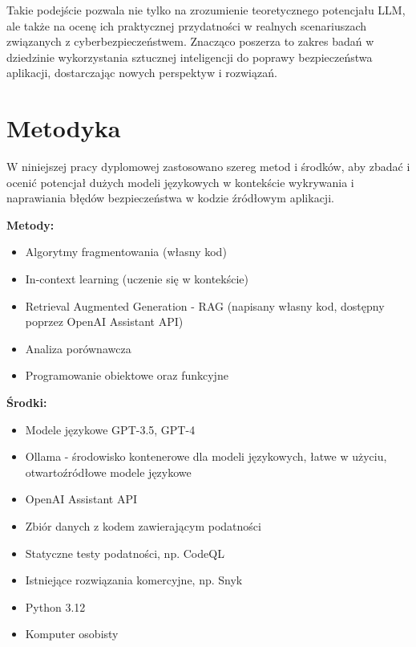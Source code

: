 Takie podejście pozwala nie tylko na zrozumienie teoretycznego potencjału LLM, ale także na ocenę ich praktycznej przydatności w realnych scenariuszach związanych z cyberbezpieczeństwem. Znacząco poszerza to zakres badań w dziedzinie wykorzystania sztucznej inteligencji do poprawy bezpieczeństwa aplikacji, dostarczając nowych perspektyw i rozwiązań.

\chapter{Metodyka}

W niniejszej pracy dyplomowej zastosowano szereg metod i środków, aby zbadać i ocenić potencjał dużych modeli językowych w kontekście wykrywania i naprawiania błędów bezpieczeństwa w kodzie źródłowym aplikacji.

\begin{multicols}{2}
\noindent
\textbf{Metody:}
\begin{itemize}
    \item Algorytmy fragmentowania (własny kod)
    \item In-context learning (uczenie się w kontekście)
    \item Retrieval Augmented Generation - RAG (napisany własny kod, dostępny poprzez OpenAI Assistant API)
    \item Analiza porównawcza
    \item Programowanie obiektowe oraz funkcyjne 
    \vfill\null
\end{itemize}

\columnbreak

\noindent
\textbf{Środki:}
\begin{itemize}
    \item Modele językowe GPT-3.5, GPT-4
    \item Ollama - środowisko kontenerowe dla modeli językowych, łatwe w użyciu, otwartoźródłowe modele językowe
    \item OpenAI Assistant API
    \item Zbiór danych z kodem zawierającym podatności
    \item Statyczne testy podatności, np. CodeQL
    \item Istniejące rozwiązania komercyjne, np. Snyk
    \item Python 3.12
    \item Komputer osobisty
\end{itemize}
\end{multicols}


